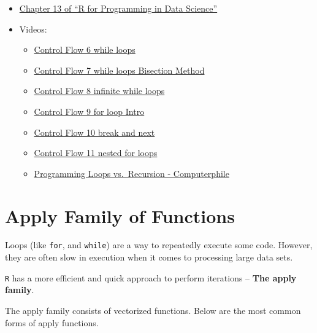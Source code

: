 \documentclass[
]{book}
\providecommand{\tightlist}{%
  \setlength{\itemsep}{0pt}\setlength{\parskip}{0pt}}
\begin{document}
\begin{itemize}
\tightlist
\item
  \href{https://bookdown.org/rdpeng/rprogdatascience/functions.html\#the-...-argument}{Chapter 13 of ``R for Programming in Data Science''}
\item
  Videos:

  \begin{itemize}
  \tightlist
  \item
    \href{https://ucr.yuja.com/V/Video?v=2369000\&node=8488272\&a=151697133\&autoplay=1}{Control Flow 6 \textbar{} while loops}
  \item
    \href{https://ucr.yuja.com/V/Video?v=2368999\&node=8488271\&a=621919520\&autoplay=1}{Control Flow 7 \textbar{} while loops Bisection Method}
  \item
    \href{https://ucr.yuja.com/V/Video?v=2368998\&node=8488270\&a=1160986069\&autoplay=1}{Control Flow 8 \textbar{} infinite while loops}
  \item
    \href{https://ucr.yuja.com/V/Video?v=2368997\&node=8488269\&a=148930850\&autoplay=1}{Control Flow 9 \textbar{} for loop Intro}
  \item
    \href{https://ucr.yuja.com/V/Video?v=2368996\&node=8488268\&a=160173707\&autoplay=1}{Control Flow 10 \textbar{} break and next}
  \item
    \href{https://ucr.yuja.com/V/Video?v=2368995\&node=8488267\&a=316843892\&autoplay=1}{Control Flow 11 \textbar{} nested for loops}
  \item
    \href{https://www.youtube.com/watch?v=HXNhEYqFo0o}{Programming Loops vs.~Recursion - Computerphile}
  \end{itemize}
\end{itemize}

\hypertarget{apply-family-of-functions}{%
\chapter{Apply Family of Functions}\label{apply-family-of-functions}}

Loops (like \texttt{for}, and \texttt{while}) are a way to repeatedly execute some code. However, they are often slow in execution when it comes to processing large data sets.

\texttt{R} has a more efficient and quick approach to perform iterations -- \textbf{The apply family}.

The apply family consists of vectorized functions. Below are the most common forms of apply functions.
\end{document}
